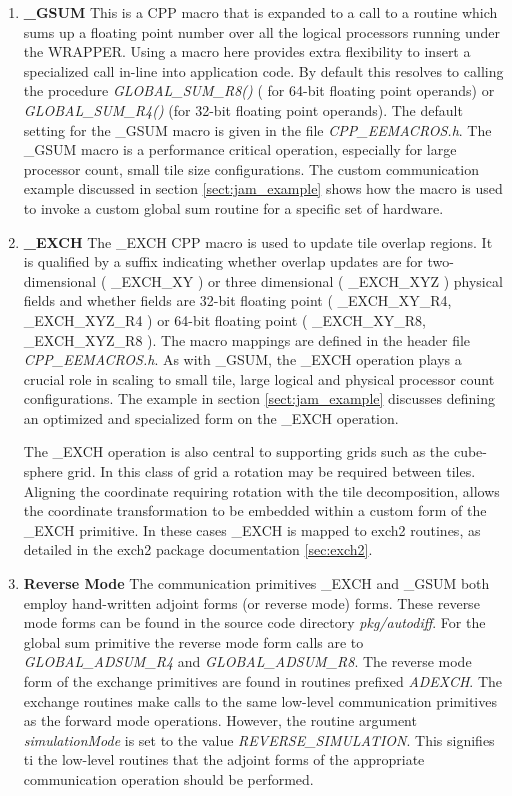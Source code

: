 \begin{enumerate}
\item {\bf \_GSUM}
This is a CPP macro that is expanded to a call to a routine
which sums up a floating point number
over all the logical processors running under the
WRAPPER. Using a macro here provides extra flexibility to insert
a specialized call in-line into application code. By default this
resolves to calling the procedure {\em GLOBAL\_SUM\_R8()} ( for
64-bit floating point operands)
or {\em GLOBAL\_SUM\_R4()} (for 32-bit floating point operands). The default
setting for the \_GSUM macro is given in the file {\em CPP\_EEMACROS.h}.
The \_GSUM macro is a performance critical operation, especially for
large processor count, small tile size configurations.
The custom communication example discussed in section \ref{sect:jam_example}
shows how the macro is used to invoke a custom global sum routine
for a specific set of hardware.

\item {\bf \_EXCH}
The \_EXCH CPP macro is used to update tile overlap regions.
It is qualified by a suffix indicating whether overlap updates are for
two-dimensional ( \_EXCH\_XY ) or three dimensional ( \_EXCH\_XYZ )
physical fields and whether fields are 32-bit floating point
( \_EXCH\_XY\_R4, \_EXCH\_XYZ\_R4 ) or 64-bit floating point
( \_EXCH\_XY\_R8, \_EXCH\_XYZ\_R8 ). The macro mappings are defined
in the header file {\em CPP\_EEMACROS.h}. As with \_GSUM, the 
\_EXCH operation plays a crucial role in scaling to small tile,
large logical and physical processor count configurations.
The example in section \ref{sect:jam_example} discusses defining an
optimized and specialized form on the \_EXCH operation.

The \_EXCH operation is also central to supporting grids such as
the cube-sphere grid. In this class of grid a rotation may be required
between tiles. Aligning the coordinate requiring rotation with the
tile decomposition, allows the coordinate transformation to 
be embedded within a custom form of the \_EXCH primitive.  In these
cases \_EXCH is mapped to exch2 routines, as detailed in the exch2
package documentation  \ref{sec:exch2}.

\item {\bf Reverse Mode}
The communication primitives \_EXCH and \_GSUM both employ 
hand-written adjoint forms (or reverse mode) forms. 
These reverse mode forms can be found in the
source code directory {\em pkg/autodiff}.
For the global sum primitive the reverse mode form
calls are to {\em GLOBAL\_ADSUM\_R4} and
{\em GLOBAL\_ADSUM\_R8}. The reverse mode form of the
exchange primitives are found in routines
prefixed {\em ADEXCH}. The exchange routines make calls to
the same low-level communication primitives as the forward mode
operations. However, the routine argument {\em simulationMode}
is set to the value {\em REVERSE\_SIMULATION}. This signifies 
ti the low-level routines that the adjoint forms of the
appropriate communication operation should be performed.


\end{enumerate}

